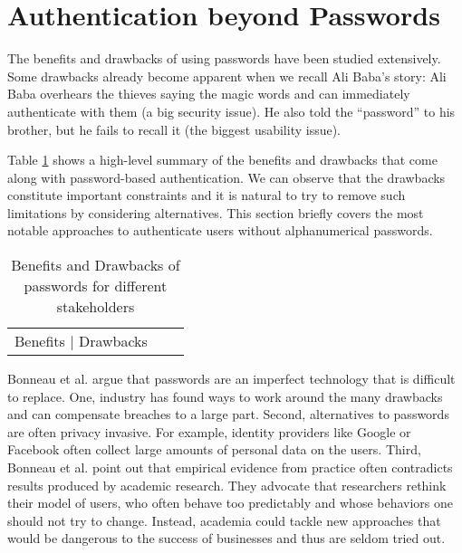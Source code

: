 \section{Authentication beyond Passwords}\label{sec:rw:authentication_without_pws}
The benefits and drawbacks of using passwords have been studied extensively. Some drawbacks already become apparent when we recall Ali Baba's story: Ali Baba overhears the thieves saying the magic words and can immediately authenticate with them (a big security issue). He also told the ``password'' to his brother, but he fails to recall it (the biggest usability issue).

Table \ref{table:rw:benefits_drawbacks_pws} shows a high-level summary of the benefits and drawbacks that come along with password-based authentication. We can observe that the drawbacks constitute important constraints and it is natural to try to remove such limitations by considering alternatives. This section briefly covers the most notable approaches to authenticate users without alphanumerical passwords.

\begin{table}
	\begin{tabular}{|l|l|l|}
		Benefits | Drawbacks 
	\end{tabular}
	\caption{\label{table:rw:benefits_drawbacks_pws}Benefits and Drawbacks of passwords for different stakeholders}
\end{table}




Bonneau et al. argue \cite{Bonneau2015ImperfectAuthentication} that passwords are an imperfect technology that is difficult to replace. One, industry has found ways to work around the many drawbacks and can compensate breaches to a large part. Second, alternatives to passwords are often privacy invasive. For example, identity providers like Google or Facebook often collect large amounts of personal data on the users. Third, Bonneau et al. point out that empirical evidence from practice often contradicts results produced by academic research. They advocate that researchers rethink their model of users, who often behave too predictably and whose behaviors one should not try to change. Instead, academia could tackle new approaches that would be dangerous to the success of businesses and thus are seldom tried out. 

